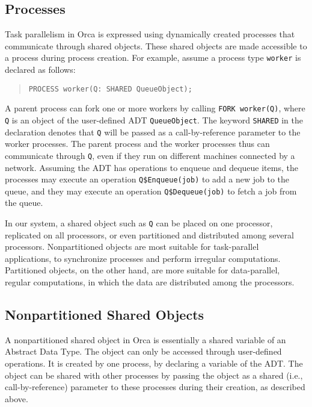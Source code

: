 \documentclass{acmtrans2e}
\begin{document}
\subsection{Processes}

Task parallelism in Orca is expressed using dynamically created
processes that communicate through shared objects. These shared
objects are made accessible to a process during process creation. For
example, assume a process type \verb+worker+ is declared as follows:

\begin{quote}
\begin{verbatim}
PROCESS worker(Q: SHARED QueueObject);
\end{verbatim}
\end{quote}

A parent process can fork one or more workers by calling 
\verb+FORK worker(Q)+, where \verb+Q+ is an object of the user-defined
ADT \verb+QueueObject+.
The keyword \verb+SHARED+ in the declaration denotes that \verb+Q+
will be passed as a call-by-reference parameter to the worker processes.
The parent process and the worker processes
thus can communicate through \verb+Q+, even if they run on different
machines connected by a network. Assuming the ADT has operations to
enqueue and dequeue items, the processes may execute an operation
\verb+Q$Enqueue(job)+ to add a new job to the queue, and
they may execute an operation \verb+Q$Dequeue(job)+ to fetch a job from
the queue.

In our system, a shared object such as \verb+Q+
can be placed on one processor, replicated on all processors, or even
partitioned and distributed among several processors. Nonpartitioned
objects are most suitable for task-parallel applications, to
synchronize processes and perform irregular computations. Partitioned
objects, on the other hand, are more suitable for data-parallel,
regular computations, in which the data are distributed among
the processors.

\subsection{Nonpartitioned Shared Objects} 

A nonpartitioned shared object in Orca is essentially a shared
variable of an Abstract Data Type. The object can only be accessed
through user-defined operations. It is created by one process, by
declaring a variable of the ADT. The object can be shared with other
processes by passing the object as a shared (i.e., call-by-reference)
parameter to these processes during their creation, as described
above.
\end{document}

